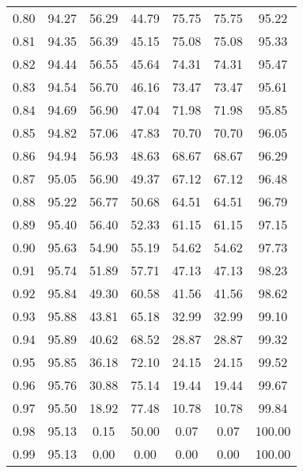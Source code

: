 \begin{tabular}{|c|c|c|c|c|c|c|}
      0.80 &     94.27 &     56.29 &      44.79 &   75.75 &      75.75 &         95.22 \\
      0.81 &     94.35 &     56.39 &      45.15 &   75.08 &      75.08 &         95.33 \\
      0.82 &     94.44 &     56.55 &      45.64 &   74.31 &      74.31 &         95.47 \\
      0.83 &     94.54 &     56.70 &      46.16 &   73.47 &      73.47 &         95.61 \\
      0.84 &     94.69 &     56.90 &      47.04 &   71.98 &      71.98 &         95.85 \\
      0.85 &     94.82 &     57.06 &      47.83 &   70.70 &      70.70 &         96.05 \\
      0.86 &     94.94 &     56.93 &      48.63 &   68.67 &      68.67 &         96.29 \\
      0.87 &     95.05 &     56.90 &      49.37 &   67.12 &      67.12 &         96.48 \\
      0.88 &     95.22 &     56.77 &      50.68 &   64.51 &      64.51 &         96.79 \\
      0.89 &     95.40 &     56.40 &      52.33 &   61.15 &      61.15 &         97.15 \\
      0.90 &     95.63 &     54.90 &      55.19 &   54.62 &      54.62 &         97.73 \\
      0.91 &     95.74 &     51.89 &      57.71 &   47.13 &      47.13 &         98.23 \\
      0.92 &     95.84 &     49.30 &      60.58 &   41.56 &      41.56 &         98.62 \\
      0.93 &     95.88 &     43.81 &      65.18 &   32.99 &      32.99 &         99.10 \\
      0.94 &     95.89 &     40.62 &      68.52 &   28.87 &      28.87 &         99.32 \\
      0.95 &     95.85 &     36.18 &      72.10 &   24.15 &      24.15 &         99.52 \\
      0.96 &     95.76 &     30.88 &      75.14 &   19.44 &      19.44 &         99.67 \\
      0.97 &     95.50 &     18.92 &      77.48 &   10.78 &      10.78 &         99.84 \\
      0.98 &     95.13 &      0.15 &      50.00 &    0.07 &       0.07 &        100.00 \\
      0.99 &     95.13 &      0.00 &       0.00 &    0.00 &       0.00 &        100.00 \\
\bottomrule
\end{tabular}
